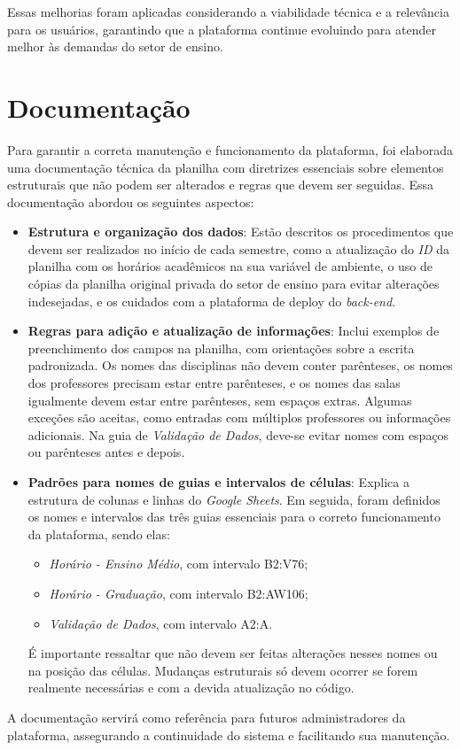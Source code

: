 Essas melhorias foram aplicadas considerando a viabilidade técnica e a relevância para os usuários, garantindo que a plataforma continue evoluindo para atender melhor às demandas do setor de ensino.

\section{Documentação}

Para garantir a correta manutenção e funcionamento da plataforma, foi elaborada uma documentação técnica da planilha com diretrizes essenciais sobre elementos estruturais que não podem ser alterados e regras que devem ser seguidas. Essa documentação abordou os seguintes aspectos:

\begin{itemize}
    \item \textbf{Estrutura e organização dos dados}: Estão descritos os procedimentos que devem ser realizados no início de cada semestre, como a atualização do \textit{ID} da planilha com os horários acadêmicos na sua variável de ambiente, o uso de cópias da planilha original privada do setor de ensino para evitar alterações indesejadas, e os cuidados com a plataforma de deploy do \textit{back-end}.
    \item \textbf{Regras para adição e atualização de informações}: Inclui exemplos de preenchimento dos campos na planilha, com orientações sobre a escrita padronizada. Os nomes das disciplinas não devem conter parênteses, os nomes dos professores precisam estar entre parênteses, e os nomes das salas igualmente devem estar entre parênteses, sem espaços extras. Algumas exceções são aceitas, como entradas com múltiplos professores ou informações adicionais. Na guia de \textit{Validação de Dados}, deve-se evitar nomes com espaços ou parênteses antes e depois.
    \item \textbf{Padrões para nomes de guias e intervalos de células}: Explica a estrutura de colunas e linhas do \textit{Google Sheets}. Em seguida, foram definidos os nomes e intervalos das três guias essenciais para o correto funcionamento da plataforma, sendo elas:
    \begin{itemize}
        \item \textit{Horário - Ensino Médio}, com intervalo B2:V76;
        \item \textit{Horário - Graduação}, com intervalo B2:AW106;
        \item \textit{Validação de Dados}, com intervalo A2:A.
    \end{itemize}
    É importante ressaltar que não devem ser feitas alterações nesses nomes ou na posição das células. Mudanças estruturais só devem ocorrer se forem realmente necessárias e com a devida atualização no código.
\end{itemize}

A documentação servirá como referência para futuros administradores da plataforma, assegurando a continuidade do sistema e facilitando sua manutenção.